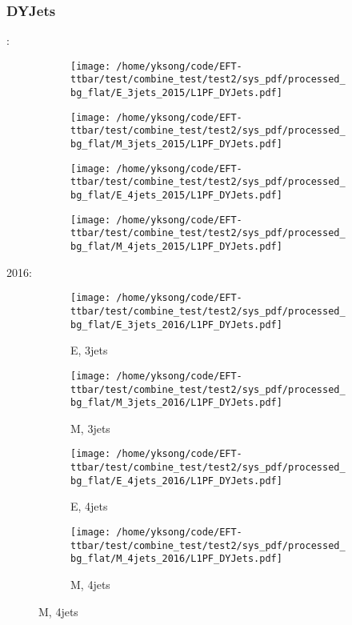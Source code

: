 \documentclass{beamer}
\begin{document}
\begin{frame}
\frametitle{DYJets}
\fontsize{5}{1}:
\begin{figure}
\centering
\begin{subfigure}[b]{0.24\textwidth}
\texttt{[image: /home/yksong/code/EFT-ttbar/test/combine\_test/test2/sys\_pdf/processed\_bg\_flat/E\_3jets\_2015/L1PF\_DYJets.pdf]}
\end{subfigure}
\begin{subfigure}[b]{0.24\textwidth}
\texttt{[image: /home/yksong/code/EFT-ttbar/test/combine\_test/test2/sys\_pdf/processed\_bg\_flat/M\_3jets\_2015/L1PF\_DYJets.pdf]}
\end{subfigure}
\begin{subfigure}[b]{0.24\textwidth}
\texttt{[image: /home/yksong/code/EFT-ttbar/test/combine\_test/test2/sys\_pdf/processed\_bg\_flat/E\_4jets\_2015/L1PF\_DYJets.pdf]}
\end{subfigure}
\begin{subfigure}[b]{0.24\textwidth}
\texttt{[image: /home/yksong/code/EFT-ttbar/test/combine\_test/test2/sys\_pdf/processed\_bg\_flat/M\_4jets\_2015/L1PF\_DYJets.pdf]}
\end{subfigure}
\end{figure}
2016:
\begin{figure}
\centering
\begin{subfigure}[b]{0.24\textwidth}
\texttt{[image: /home/yksong/code/EFT-ttbar/test/combine\_test/test2/sys\_pdf/processed\_bg\_flat/E\_3jets\_2016/L1PF\_DYJets.pdf]}
\captionsetup{font=tiny}
\caption{E, 3jets}
\end{subfigure}
\begin{subfigure}[b]{0.24\textwidth}
\texttt{[image: /home/yksong/code/EFT-ttbar/test/combine\_test/test2/sys\_pdf/processed\_bg\_flat/M\_3jets\_2016/L1PF\_DYJets.pdf]}
\captionsetup{font=tiny}
\caption{M, 3jets}
\end{subfigure}
\begin{subfigure}[b]{0.24\textwidth}
\texttt{[image: /home/yksong/code/EFT-ttbar/test/combine\_test/test2/sys\_pdf/processed\_bg\_flat/E\_4jets\_2016/L1PF\_DYJets.pdf]}
\captionsetup{font=tiny}
\caption{E, 4jets}
\end{subfigure}
\begin{subfigure}[b]{0.24\textwidth}
\texttt{[image: /home/yksong/code/EFT-ttbar/test/combine\_test/test2/sys\_pdf/processed\_bg\_flat/M\_4jets\_2016/L1PF\_DYJets.pdf]}
\captionsetup{font=tiny}
\caption{M, 4jets}
\end{subfigure}
\end{figure}
\end{frame}
\end{document}
